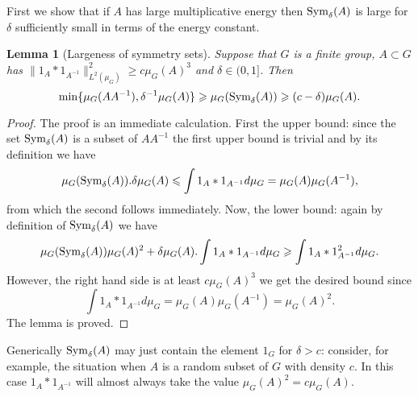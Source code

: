 \documentclass[12pt]{amsart}
\numberwithin{equation}{section}
\theoremstyle{plain}
\newtheorem{lemma}[subsection]{Lemma}
\theoremstyle{definition}
\renewcommand{\leq}{\leqslant}
\renewcommand{\geq}{\geqslant}
\providecommand{\Sym}{\mathop{\rm Sym}\nolimits}
\begin{document}
First we show that if $A$ has large multiplicative energy then $\Sym_\delta(A)$ is large for $\delta$ sufficiently small in terms of the energy constant.
\begin{lemma}[Largeness of symmetry sets]\label{lem.symsize}
Suppose that $G$ is a finite group, $A \subset G$ has $\|1_A \ast 1_{A^{-1}}\|_{L^2(\mu_G)}^2 \geq c\mu_G(A)^3$ and $\delta \in (0,1]$.  Then
\begin{equation*}
\min\{\mu_G(AA^{-1}),\delta^{-1}\mu_G(A)\} \geq \mu_G(\Sym_{\delta}(A)) \geq (c-\delta)\mu_G(A).
\end{equation*}
\end{lemma}
\begin{proof}
The proof is an immediate calculation. First the upper bound: since the set $\Sym_\delta(A)$ is a subset of $AA^{-1}$ the first upper bound is trivial and by its definition we have
\begin{equation*}
\mu_G(\Sym_\delta(A)).\delta \mu_G(A) \leq \int{1_A \ast 1_{A^{-1}}d\mu_G} = \mu_G(A)\mu_G(A^{-1}),
\end{equation*}
from which the second follows immediately.  Now, the lower bound: again by definition of $\Sym_\delta(A)$ we have
\begin{equation*}
\mu_G(\Sym_\delta(A))\mu_G(A)^2 + \delta\mu_G(A).\int{1_A \ast 1_{A^{-1}}d\mu_G} \geq  \int{1_A \ast 1_{A^{-1}}^2d\mu_G}.
\end{equation*}
However, the right hand side is at least $c\mu_G(A)^3$ we get the desired bound since
\begin{equation*}
\int{1_A \ast 1_{A^{-1}}d\mu_G} =\mu_G(A)\mu_G(A^{-1})=\mu_G(A)^2.
\end{equation*}
The lemma is proved.
\end{proof}
Generically $\Sym_{\delta}(A)$ may just contain the element $1_G$ for $\delta>c$: consider, for example, the situation when $A$ is a random subset of $G$ with density $c$.  In this case $1_A \ast 1_{A^{-1}}$ will almost always take the value $\mu_G(A)^2=c\mu_G(A)$. 
\end{document}
